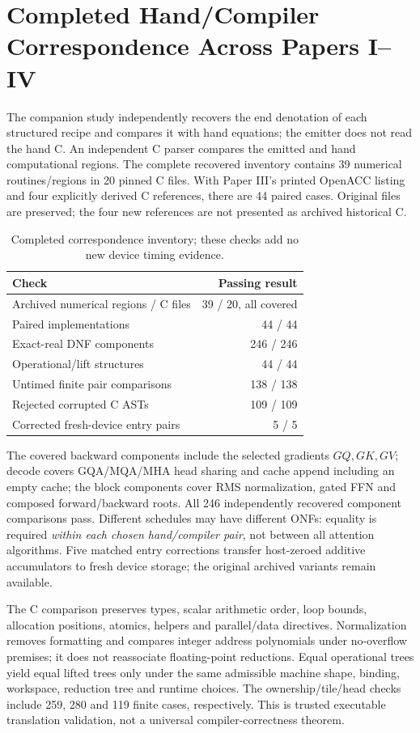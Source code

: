 \documentclass[sigplan,10pt,review,balance=false,pbalance=false]{acmart}
\begin{document}
\section{Completed Hand/Compiler Correspondence Across Papers I--IV}
\label{sec:completed-suite}
The companion study independently recovers the end denotation of each structured recipe and compares it with hand equations; the emitter does not read the hand C. An independent C parser compares the emitted and hand computational regions. The complete recovered inventory contains 39 numerical routines/regions in 20 pinned C files. With Paper III's printed OpenACC listing and four explicitly derived C references, there are 44 paired cases. Original files are preserved; the four new references are not presented as archived historical C.

\begin{table}[t]\centering\footnotesize
\caption{Completed correspondence inventory; these checks add no new device timing evidence.}\label{tab:completed-suite}
\begin{tabular}{@{}lr@{}}\toprule
Check & Passing result\\\midrule
Archived numerical regions / C files & 39 / 20, all covered\\
Paired implementations & 44 / 44\\
Exact-real DNF components & 246 / 246\\
Operational/lift structures & 44 / 44\\
Untimed finite pair comparisons & 138 / 138\\
Rejected corrupted C ASTs & 109 / 109\\
Corrected fresh-device entry pairs & 5 / 5\\\bottomrule
\end{tabular}\end{table}

The covered backward components include the selected gradients $GQ,GK,GV$; decode covers GQA/MQA/MHA head sharing and cache append including an empty cache; the block components cover RMS normalization, gated FFN and composed forward/backward roots. All 246 independently recovered component comparisons pass. Different schedules may have different ONFs: equality is required \emph{within each chosen hand/compiler pair}, not between all attention algorithms. Five matched entry corrections transfer host-zeroed additive accumulators to fresh device storage; the original archived variants remain available.

The C comparison preserves types, scalar arithmetic order, loop bounds, allocation positions, atomics, helpers and parallel/data directives. Normalization removes formatting and compares integer address polynomials under no-overflow premises; it does not reassociate floating-point reductions. Equal operational trees yield equal lifted trees only under the same admissible machine shape, binding, workspace, reduction tree and runtime choices. The ownership/tile/head checks include 259, 280 and 119 finite cases, respectively. This is trusted executable translation validation, not a universal compiler-correctness theorem.
\end{document}

